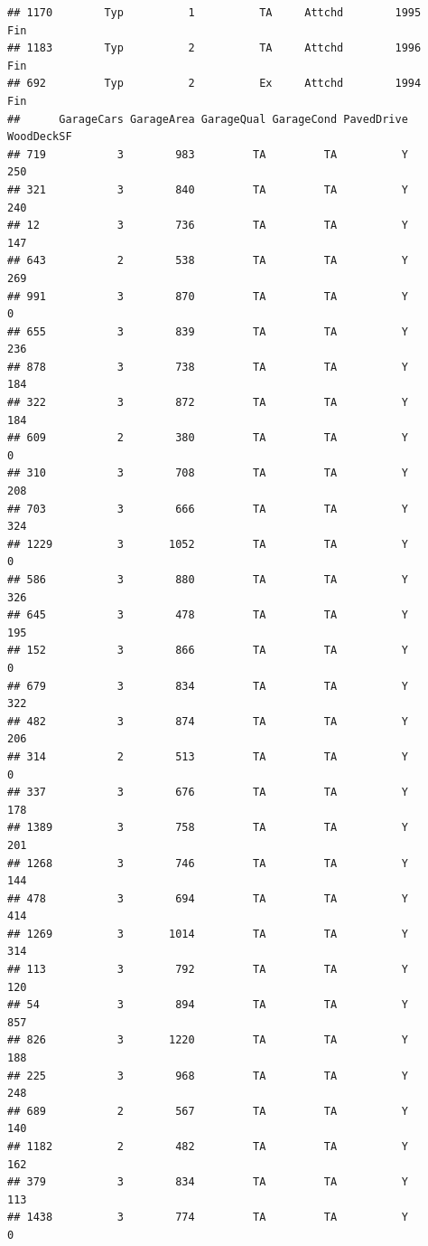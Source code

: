 \documentclass[]{article}
\begin{document}
\begin{verbatim}
## 1170        Typ          1          TA     Attchd        1995          Fin
## 1183        Typ          2          TA     Attchd        1996          Fin
## 692         Typ          2          Ex     Attchd        1994          Fin
##      GarageCars GarageArea GarageQual GarageCond PavedDrive WoodDeckSF
## 719           3        983         TA         TA          Y        250
## 321           3        840         TA         TA          Y        240
## 12            3        736         TA         TA          Y        147
## 643           2        538         TA         TA          Y        269
## 991           3        870         TA         TA          Y          0
## 655           3        839         TA         TA          Y        236
## 878           3        738         TA         TA          Y        184
## 322           3        872         TA         TA          Y        184
## 609           2        380         TA         TA          Y          0
## 310           3        708         TA         TA          Y        208
## 703           3        666         TA         TA          Y        324
## 1229          3       1052         TA         TA          Y          0
## 586           3        880         TA         TA          Y        326
## 645           3        478         TA         TA          Y        195
## 152           3        866         TA         TA          Y          0
## 679           3        834         TA         TA          Y        322
## 482           3        874         TA         TA          Y        206
## 314           2        513         TA         TA          Y          0
## 337           3        676         TA         TA          Y        178
## 1389          3        758         TA         TA          Y        201
## 1268          3        746         TA         TA          Y        144
## 478           3        694         TA         TA          Y        414
## 1269          3       1014         TA         TA          Y        314
## 113           3        792         TA         TA          Y        120
## 54            3        894         TA         TA          Y        857
## 826           3       1220         TA         TA          Y        188
## 225           3        968         TA         TA          Y        248
## 689           2        567         TA         TA          Y        140
## 1182          2        482         TA         TA          Y        162
## 379           3        834         TA         TA          Y        113
## 1438          3        774         TA         TA          Y          0

\end{verbatim}
\end{document}
